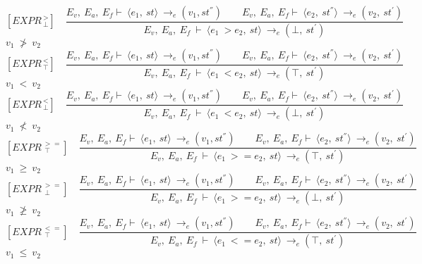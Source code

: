 \[	
[EXPR^{\ >}_{\ \bot}] \quad	
\dfrac{E_v, \ E_a, \ E_f \vdash \ \langle e_1, \ st \rangle \ \rightarrow_e (v_1, st^{''}) \qquad E_v, \ E_a, \ E_f \vdash \ \langle e_2, \ st^{''} \rangle \ \rightarrow_e (v_2, \ st^{'})}{E_v, \ E_a, \ E_f \ \vdash \ \langle e_1 \ > e_2, \ st \rangle \ \rightarrow_e (\bot, \ st^{'})}
\]
\begin{math}		
v_1 \ \not> \ v_2		
\end{math} 
\[	
[EXPR^{\ <}_{\ \top}] \quad	
\dfrac{E_v, \ E_a, \ E_f \vdash \ \langle e_1, \ st \rangle \ \rightarrow_e (v_1, st^{''}) \qquad E_v, \ E_a, \ E_f \vdash \ \langle e_2, \ st^{''} \rangle \ \rightarrow_e (v_2, \ st^{'})}{E_v, \ E_a, \ E_f \ \vdash \ \langle e_1 \ < e_2, \ st \rangle \ \rightarrow_e (\top, \ st^{'})}
\]
\begin{math}		
v_1 \ < \ v_2		
\end{math} 
\[	
[EXPR^{\ <}_{\ \bot}] \quad	
\dfrac{E_v, \ E_a, \ E_f \vdash \ \langle e_1, \ st \rangle \ \rightarrow_e (v_1, st^{''}) \qquad E_v, \ E_a, \ E_f \vdash \ \langle e_2, \ st^{''} \rangle \ \rightarrow_e (v_2, \ st^{'})}{E_v, \ E_a, \ E_f \ \vdash \ \langle e_1 \ < e_2, \ st \rangle \ \rightarrow_e (\bot, \ st^{'})}	
\]
\begin{math}		
v_1 \ \not< \ v_2		
\end{math}
\[	
[EXPR^{\ >=}_{\ \ \top}] \quad	
\dfrac{E_v, \ E_a, \ E_f \vdash \ \langle e_1, \ st \rangle \ \rightarrow_e (v_1, st^{''}) \qquad E_v, \ E_a, \ E_f \vdash \ \langle e_2, \ st^{''} \rangle \ \rightarrow_e (v_2, \ st^{'})}{E_v, \ E_a, \ E_f \ \vdash \ \langle e_1 \ >= e_2, \ st \rangle \ \rightarrow_e (\top, \ st^{'})}	
\]
\begin{math}		
v_1 \ \ge \ v_2		
\end{math} 
\[	
[EXPR^{\ >=}_{\ \ \bot}] \quad	
\dfrac{E_v, \ E_a, \ E_f \vdash \ \langle e_1, \ st \rangle \ \rightarrow_e (v_1, st^{''}) \qquad E_v, \ E_a, \ E_f \vdash \ \langle e_2, \ st^{''} \rangle \ \rightarrow_e (v_2, \ st^{'})}{E_v, \ E_a, \ E_f \ \vdash \ \langle e_1 \ >= e_2, \ st \rangle \ \rightarrow_e (\bot, \ st^{'})}	
\]
\begin{math}		
v_1 \ \ngeq \ v_2		
\end{math}
\[
[EXPR^{\ <=}_{\ \ \top}] \quad
\dfrac{E_v, \ E_a, \ E_f \vdash \ \langle e_1, \ st \rangle \ \rightarrow_e (v_1, st^{''}) \qquad E_v, \ E_a, \ E_f \vdash \ \langle e_2, \ st^{''} \rangle \ \rightarrow_e (v_2, \ st^{'})}{E_v, \ E_a, \ E_f \ \vdash \ \langle e_1 \ <= e_2, \ st \rangle \ \rightarrow_e (\top, \ st^{'})}
\]
\begin{math}		
v_1 \ \le \ v_2		
\end{math} 
